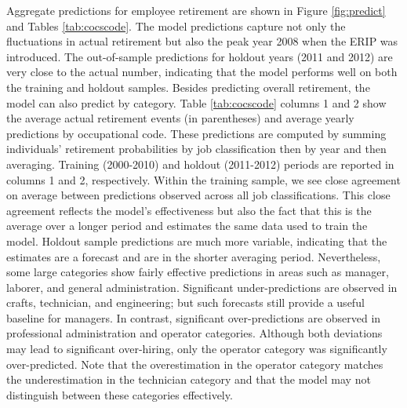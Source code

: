 Aggregate predictions for employee retirement are shown in Figure \ref{fig:predict} and Tables \ref{tab:cocscode}. %
The model predictions capture not only the fluctuations in actual retirement but also the peak year 2008 when the ERIP was introduced. The out-of-sample predictions for holdout years (2011 and 2012) are very close to the actual number, indicating that the model performs well on both the training and holdout samples. Besides predicting overall retirement, the model can also predict by category. Table \ref{tab:cocscode} columns 1 and 2 show the average actual retirement events (in parentheses) and average yearly predictions by occupational code. These predictions are computed by summing individuals' retirement probabilities by job classification then by year and then averaging. Training (2000-2010) and holdout (2011-2012) periods are reported in columns 1 and 2, respectively. Within the training sample, we see close agreement on average between predictions observed across all job classifications. This close agreement reflects the model's effectiveness but also the fact that this is the average over a longer period and estimates the same data used to train the model. Holdout sample predictions are much more variable, indicating that the estimates are a forecast and are in the shorter averaging period. Nevertheless, some large categories show fairly effective predictions in areas such as manager, laborer, and general administration.  Significant under-predictions are observed in crafts, technician, and engineering; but such forecasts still provide a useful baseline for managers. In contrast, significant over-predictions are observed in professional administration and operator categories. Although both deviations may lead to significant over-hiring, only the operator category was significantly over-predicted. Note that the overestimation in the operator category matches the underestimation in the technician category and that the model may not distinguish between these categories effectively.%
	 
